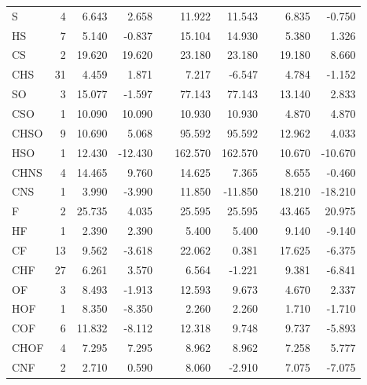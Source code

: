 \begin{table}
\begin{center}
\begin{tabular}{lrrrrrrrrr}
      S       &      4 &    6.643 &    2.658 &  &   11.922 &   11.543 &  &    6.835 &   -0.750 \\
      HS      &      7 &    5.140 &   -0.837 &  &   15.104 &   14.930 &  &    5.380 &    1.326 \\
      CS      &      2 &   19.620 &   19.620 &  &   23.180 &   23.180 &  &   19.180 &    8.660 \\
      CHS     &     31 &    4.459 &    1.871 &  &    7.217 &   -6.547 &  &    4.784 &   -1.152 \\
      SO      &      3 &   15.077 &   -1.597 &  &   77.143 &   77.143 &  &   13.140 &    2.833 \\
      CSO     &      1 &   10.090 &   10.090 &  &   10.930 &   10.930 &  &    4.870 &    4.870 \\
      CHSO    &      9 &   10.690 &    5.068 &  &   95.592 &   95.592 &  &   12.962 &    4.033 \\
      HSO     &      1 &   12.430 &  -12.430 &  &  162.570 &  162.570 &  &   10.670 &  -10.670 \\
      CHNS    &      4 &   14.465 &    9.760 &  &   14.625 &    7.365 &  &    8.655 &   -0.460 \\
      CNS     &      1 &    3.990 &   -3.990 &  &   11.850 &  -11.850 &  &   18.210 &  -18.210 \\
      F       &      2 &   25.735 &    4.035 &  &   25.595 &   25.595 &  &   43.465 &   20.975 \\
      HF      &      1 &    2.390 &    2.390 &  &    5.400 &    5.400 &  &    9.140 &   -9.140 \\
      CF      &     13 &    9.562 &   -3.618 &  &   22.062 &    0.381 &  &   17.625 &   -6.375 \\
      CHF     &     27 &    6.261 &    3.570 &  &    6.564 &   -1.221 &  &    9.381 &   -6.841 \\
      OF      &      3 &    8.493 &   -1.913 &  &   12.593 &    9.673 &  &    4.670 &    2.337 \\
      HOF     &      1 &    8.350 &   -8.350 &  &    2.260 &    2.260 &  &    1.710 &   -1.710 \\
      COF     &      6 &   11.832 &   -8.112 &  &   12.318 &    9.748 &  &    9.737 &   -5.893 \\
      CHOF    &      4 &    7.295 &    7.295 &  &    8.962 &    8.962 &  &    7.258 &    5.777 \\
      CNF     &      2 &    2.710 &    0.590 &  &    8.060 &   -2.910 &  &    7.075 &   -7.075 \\

\end{tabular}
\end{center}
\end{table}
